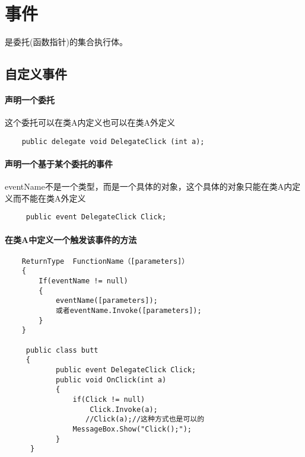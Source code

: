 \documentclass[UTF8,a4paper,12pt]{ctexbook}
\begin{document}
		 	
		 	　　 
		 	
		 	 　　
		 	
		 	       
		 	
		 	　　 
	\section{事件}
		是委托(函数指针)的集合执行体。
		\subsection{自定义事件}
			\paragraph{声明一个委托}
			
				这个委托可以在类A内定义也可以在类A外定义
			
				\begin{lstlisting}
	public delegate void DelegateClick (int a);
				\end{lstlisting}
			\paragraph{声明一个基于某个委托的事件}
				
				eventName不是一个类型，而是一个具体的对象，这个具体的对象只能在类A内定义而不能在类A外定义
				
				\begin{lstlisting}
	 public event DelegateClick Click;
				\end{lstlisting}
				
			\paragraph{在类A中定义一个触发该事件的方法}
				
				\begin{lstlisting}
	ReturnType  FunctionName（[parameters]）	
	{
		If(eventName != null)
		{
			eventName([parameters]);
			或者eventName.Invoke([parameters]);
		}
	}
	
	 public class butt
	 {
	        public event DelegateClick Click;
	        public void OnClick(int a)
	        {
	            if(Click != null)
	                Click.Invoke(a);
	               //Click(a);//这种方式也是可以的
	            MessageBox.Show("Click();");
	        }
	  }
				\end{lstlisting}
			
\end{document}
